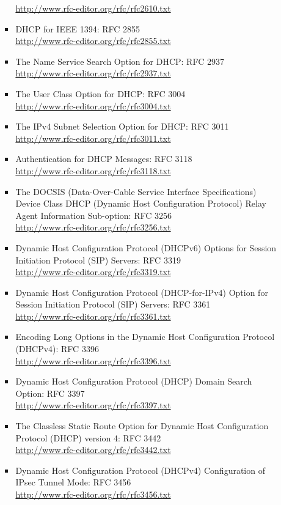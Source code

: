 \begin{itemize}
\begin{itemize}
\begin{itemize}
\url{http://www.rfc-editor.org/rfc/rfc2610.txt}
\item DHCP for IEEE 1394: RFC 2855\\
\url{http://www.rfc-editor.org/rfc/rfc2855.txt}
\item The Name Service Search Option for DHCP: RFC 2937\\
\url{http://www.rfc-editor.org/rfc/rfc2937.txt}
\item The User Class Option for DHCP: RFC 3004\\
\url{http://www.rfc-editor.org/rfc/rfc3004.txt}
\item The IPv4 Subnet Selection Option for DHCP: RFC 3011\\
\url{http://www.rfc-editor.org/rfc/rfc3011.txt}
\item Authentication for DHCP Messages: RFC 3118\\
\url{http://www.rfc-editor.org/rfc/rfc3118.txt}
\item The DOCSIS (Data-Over-Cable Service Interface Specifications) 
Device Class DHCP (Dynamic Host Configuration Protocol) Relay Agent 
Information Sub-option: RFC 3256\\
\url{http://www.rfc-editor.org/rfc/rfc3256.txt}
\item Dynamic Host Configuration Protocol (DHCPv6) Options for Session 
Initiation Protocol (SIP) Servers: RFC 3319\\
\url{http://www.rfc-editor.org/rfc/rfc3319.txt}
\item Dynamic Host Configuration Protocol (DHCP-for-IPv4) Option for 
Session Initiation Protocol (SIP) Servers: RFC 3361\\
\url{http://www.rfc-editor.org/rfc/rfc3361.txt}
\item Encoding Long Options in the Dynamic Host Configuration Protocol 
(DHCPv4): RFC 3396\\
\url{http://www.rfc-editor.org/rfc/rfc3396.txt}
\item Dynamic Host Configuration Protocol (DHCP) Domain Search Option: 
RFC 3397\\
\url{http://www.rfc-editor.org/rfc/rfc3397.txt}
\item The Classless Static Route Option for Dynamic Host Configuration 
Protocol (DHCP) version 4: RFC 3442\\
\url{http://www.rfc-editor.org/rfc/rfc3442.txt}
\item Dynamic Host Configuration Protocol (DHCPv4) Configuration of 
IPsec Tunnel Mode: RFC 3456\\
\url{http://www.rfc-editor.org/rfc/rfc3456.txt}

\end{itemize}
\end{itemize}
\end{itemize}
